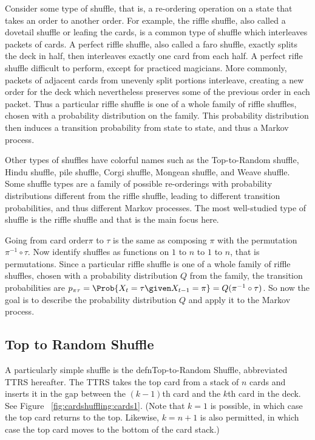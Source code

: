 \documentclass[12pt]{article}
\begin{document}
Consider some type of shuffle, that is, a re-ordering
operation on a state that takes an order to another order.  For
example, the riffle shuffle, also called a dovetail shuffle or leafing
the cards, is a common type of shuffle which
interleaves packets of cards.  A perfect riffle shuffle, also called a
faro shuffle, exactly splits
the deck in half, then interleaves exactly one card from each half.  A
perfect rifle shuffle difficult to
perform, except for practiced magicians.  More commonly, packets of
adjacent cards from  unevenly split portions interleave, creating a
new order for the deck which nevertheless preserves some of the
previous order in each packet.  Thus a particular riffle shuffle is one of a
whole family of riffle shuffles, chosen  with a probability
distribution on the family.  This probability distribution then
induces a transition probability from state to state, and thus a
Markov process.

Other types of shuffles have colorful names such as the Top-to-Random
shuffle,
Hindu shuffle,
pile shuffle, Corgi shuffle, Mongean shuffle, and Weave shuffle.
Some shuffle types are a family of possible re-orderings
with probability distributions different from the riffle
shuffle, leading to different transition probabilities, and thus
different Markov processes.  The most well-studied type of shuffle is
the riffle shuffle and that is the main focus here.

Going from card order\( \pi \) to \( \tau \) is
the same as composing \( \pi \) with the permutation \( \pi^{-1} \circ
\tau \).  Now identify shuffles as functions on  \( 1 \) to \( n \) to
\( 1 \) to \( n \),  that is permutations.
Since a particular riffle shuffle is one of a
whole family of riffle shuffles, chosen  with a probability
distribution \( Q \) from the family,
the transition probabilities are \( p_{\pi \tau} = \Prob{X_t =
\tau \given X_{t-1} = \pi} = Q(\pi^{-1} \circ \tau) \).  So now the
goal is to describe the probability distribution \( Q \) and apply it
to the Markov process.


\subsection*{Top to Random Shuffle}
A particularly simple shuffle is the
 defn{Top-to-Random Shuffle},%
abbreviated TTRS hereafter.  The TTRS takes the top card from a stack of \( n \)
cards and inserts it in the gap between the \( (k-1) \)th card and the \(
k \)th card in the deck.  See Figure~%
\ref{fig:cardshuffling:cards1}. (Note that \( k = 1 \) is possible, in
which case the top card returns to the top.  Likewise, \( k = n+1 \) is
also permitted, in which case the top card moves to the bottom of the
card stack.)
\end{document}
